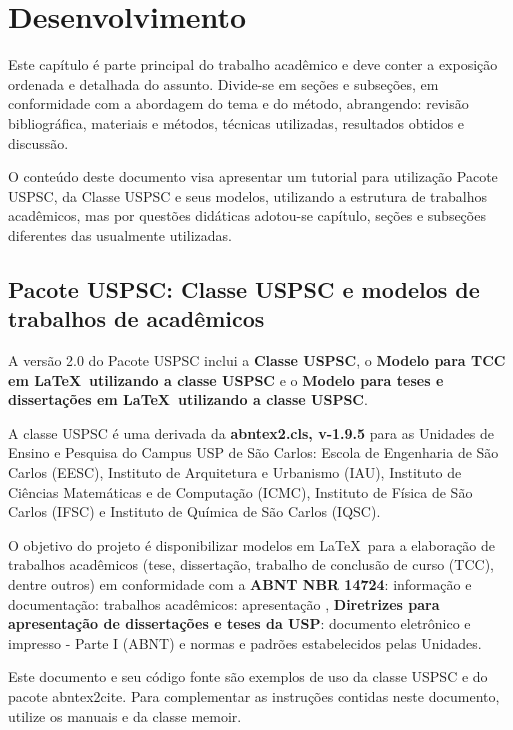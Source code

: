 

\chapter{Desenvolvimento}\label{cap_exemplos}
Este capítulo é parte principal do trabalho acadêmico e deve conter a exposição ordenada e detalhada do assunto. Divide-se em seções e subseções, em conformidade com a abordagem do tema e do método, abrangendo: revisão bibliográfica, materiais e métodos, técnicas utilizadas, resultados obtidos e discussão.

O conteúdo deste documento visa apresentar um tutorial para utilização Pacote USPSC, da Classe USPSC e seus modelos, utilizando a estrutura de trabalhos acadêmicos, mas por questões didáticas adotou-se capítulo, seções e subseções diferentes das usualmente utilizadas.


\section{Pacote USPSC: Classe USPSC e modelos de trabalhos de acadêmicos}
A versão 2.0 do Pacote USPSC inclui a \textbf{Classe USPSC}, o \textbf{Modelo para TCC em \LaTeX\ utilizando a classe USPSC} e o \textbf{Modelo para teses e dissertações em \LaTeX\ utilizando a classe USPSC}.

A classe USPSC é uma derivada da \textbf{\textsf{abntex2}.cls, v-1.9.5} para as Unidades de Ensino e Pesquisa do Campus USP de São Carlos:
Escola de Engenharia de São Carlos (EESC), Instituto de Arquitetura e Urbanismo (IAU), Instituto de Ciências Matemáticas e de Computação (ICMC), Instituto de Física de São Carlos (IFSC) e Instituto de Química de São Carlos (IQSC).

O objetivo do projeto é disponibilizar modelos em \LaTeX\  para a elaboração de trabalhos acadêmicos (tese, dissertação, trabalho de conclusão de curso (TCC), dentre outros) em conformidade com a \textbf{ABNT NBR 14724}: informação e documentação: trabalhos acadêmicos: apresentação \cite{nbr14724}, \textbf{Diretrizes para apresentação de dissertações e teses da USP}: documento eletrônico e impresso - Parte I (ABNT) \cite{sibi2016} e normas e padrões estabelecidos pelas Unidades.

Este documento e seu código fonte são exemplos de uso da classe USPSC e do pacote \textsf{abntex2cite}.
Para complementar as instruções contidas neste documento, utilize os manuais \cite{abnetxclasse,abnetxcite,abnetxcitealf} e da classe \textsf{memoir}\cite{memoir2010}. 


